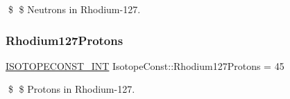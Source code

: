\$ \$ Neutrons in Rhodium-\/127. \mbox{\label{group___isotope_const-_rhodium-_rh127_ga062f4cedd7715acb5d6091ad22984e5d}} 
\subsubsection{\texorpdfstring{Rhodium127\+Protons}{Rhodium127Protons}}
{\footnotesize\ttfamily \mbox{\hyperlink{group___isotope_const-_macros_ga5f18360b3e99483a35c32d789e62621c}{I\+S\+O\+T\+O\+P\+E\+C\+O\+N\+S\+T\+\_\+\+I\+NT}} Isotope\+Const\+::\+Rhodium127\+Protons = 45}

\$ \$ Protons in Rhodium-\/127. 
